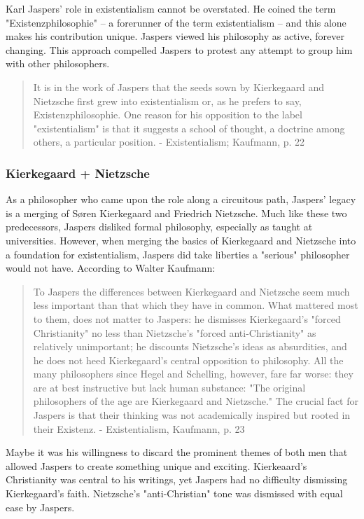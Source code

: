 \documentclass[12pt]{article}
\begin{document}
Karl Jaspers' role in existentialism cannot be overstated. He coined the term "Existenzphilosophie" -- a forerunner of the term
existentialism -- and this alone makes his contribution unique. Jaspers viewed his philosophy as active, forever changing. This
approach compelled Jaspers to protest any attempt to group him with other philosophers. 
\begin{quote}
          It is in the work of Jaspers that the seeds sown by Kierkegaard and Nietzsche first grew into existentialism or, as he
          prefers to say, Existenzphilosophie. One reason for his opposition to the label "existentialism" is that it suggests a
          school of thought, a doctrine among others, a particular position.
          - Existentialism; Kaufmann, p. 22
\end{quote}

\subsubsection{Kierkegaard + Nietzsche}

As a philosopher who came upon the role along a circuitous path, Jaspers' 
legacy is a merging of S{\o}ren Kierkegaard and Friedrich
Nietzsche. Much like these two predecessors, Jaspers disliked formal philosophy, especially as taught at universities. However,
when merging the basics of Kierkegaard and Nietzsche into a foundation for existentialism, Jaspers did take liberties a "serious"
philosopher would not have. According to Walter Kaufmann: 
\begin{quote}
          To Jaspers the differences between Kierkegaard and Nietzsche seem much less important than that which they have
          in common. What mattered most to them, does not matter to Jaspers: he dismisses Kierkegaard's "forced
          Christianity" no less than Nietzsche's "forced anti-Christianity" as relatively unimportant; he discounts Nietzsche's
          ideas as absurdities, and he does not heed Kierkegaard's central opposition to philosophy. All the many philosophers
          since Hegel and Schelling, however, fare far worse: they are at best instructive but lack human substance: "The
          original philosophers of the age are Kierkegaard and Nietzsche." The crucial fact for Jaspers is that their thinking
          was not academically inspired but rooted in their Existenz. 
          - Existentialism, Kaufmann, p. 23 
\end{quote}
Maybe it was his willingness to discard the prominent themes of both men that allowed Jaspers to create something unique and
exciting. Kierkeaard's Christianity was central to his writings, yet Jaspers had no difficulty dismissing Kierkegaard's faith.
Nietzsche's "anti-Christian" tone was dismissed with equal ease by Jaspers. 
\end{document}
